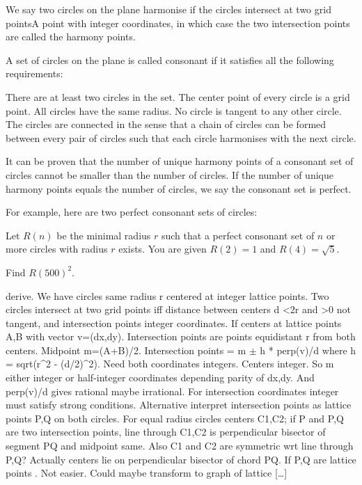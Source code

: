 \begin{decodedpromptpanel}
We say two circles on the plane harmonise if the circles intersect at two grid pointsA point with integer coordinates, in which case the two intersection points are called the harmony points.

A set of circles on the plane is called consonant if it satisfies all the following requirements:

 There are at least two circles in the set.
 The center point of every circle is a grid point.
 All circles have the same radius.
 No circle is tangent to any other circle.
 The circles are connected in the sense that a chain of circles can be formed between every pair of circles such that each circle harmonises with the next circle.

It can be proven that the number of unique harmony points of a consonant set of circles cannot be smaller than the number of circles. If the number of unique harmony points equals the number of circles, we say the consonant set is perfect.

For example, here are two perfect consonant sets of circles:

Let $R(n)$ be the minimal radius $r$ such that a perfect consonant set of $n$ or more circles with radius $r$ exists.
You are given $R(2) = 1$ and $R(4) = \sqrt{5}$.

Find $R(500)^2$.
\end{decodedpromptpanel}

\begin{decodedreasoningpanel}
derive. We have circles same radius r centered at integer lattice points. Two circles intersect at two grid points iff distance between centers d <2r and >0 not tangent, and intersection points integer coordinates. If centers at lattice points A,B with vector v=(dx,dy). Intersection points are points equidistant r from both centers. Midpoint m=(A+B)/2. Intersection points = m $\pm$ h * perp(v)/d where h = sqrt(r\textasciicircum{}2 - (d/2)\textasciicircum{}2). Need both coordinates integers. Centers integer. So m either integer or half-integer coordinates depending parity of dx,dy. And perp(v)/d gives rational maybe irrational. For intersection coordinates integer must satisfy strong conditions. Alternative interpret intersection points as lattice points P,Q on both circles. For equal radius circles centers C1,C2; if P and P,Q are two intersection points, line through C1,C2 is perpendicular bisector of segment PQ and midpoint same. Also C1 and C2 are symmetric wrt line through P,Q? Actually centers lie on perpendicular bisector of chord PQ. If P,Q are lattice points . Not easier. Could maybe transform to graph of lattice {[\ldots]}
\end{decodedreasoningpanel}

